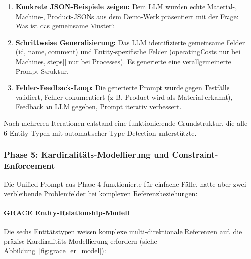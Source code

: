 \begin{enumerate}
    \item \textbf{Konkrete JSON-Beispiele zeigen:} Dem LLM wurden echte Material-, Machine-, Product-JSONs aus dem Demo-Werk präsentiert mit der Frage: \glqq Was ist das gemeinsame Muster?\grqq{}

    \item \textbf{Schrittweise Generalisierung:} Das LLM identifizierte gemeinsame Felder (\url{id}, \url{name}, \url{comment}) und Entity-spezifische Felder (\url{operatingCosts} nur bei Machines, \url{steps[]} nur bei Processes). Es generierte eine verallgemeinerte Prompt-Struktur.

    \item \textbf{Fehler-Feedback-Loop:} Die generierte Prompt wurde gegen Testfälle validiert, Fehler dokumentiert (z.\,B. \glqq Product wird als Material erkannt\grqq{}), Feedback an LLM gegeben, Prompt iterativ verbessert.
\end{enumerate}

\noindent Nach mehreren Iterationen entstand eine funktionierende Grundstruktur, die alle 6 Entity-Typen mit automatischer Type-Detection unterstützte.

\subsubsection{Phase 5: Kardinalitäts-Modellierung und Constraint-Enforcement}

Die Unified Prompt aus Phase 4 funktionierte für einfache Fälle, hatte aber zwei verbleibende Problemfelder bei komplexen Referenzbeziehungen:

\paragraph{GRACE Entity-Relationship-Modell}

Die sechs Entitätstypen weisen komplexe multi-direktionale Referenzen auf, die präzise Kardinalitäts-Modellierung erfordern (siehe Abbildung~\ref{fig:grace_er_model}):

